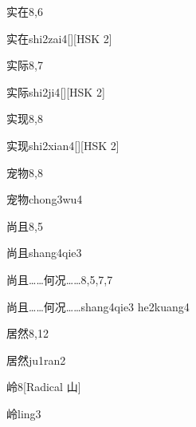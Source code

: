 \begin{entry}{实在}{8,6}
  \begin{phonetics}{实在}{shi2zai4}[][HSK 2]
  \end{phonetics}
\end{entry}

\begin{entry}{实际}{8,7}
  \begin{phonetics}{实际}{shi2ji4}[][HSK 2]
  \end{phonetics}
\end{entry}

\begin{entry}{实现}{8,8}
  \begin{phonetics}{实现}{shi2xian4}[][HSK 2]
  \end{phonetics}
\end{entry}

\begin{entry}{宠物}{8,8}
  \begin{phonetics}{宠物}{chong3wu4}
  \end{phonetics}
\end{entry}

\begin{entry}{尚且}{8,5}
  \begin{phonetics}{尚且}{shang4qie3}
  \end{phonetics}
\end{entry}

\begin{entry}{尚且……何况……}{8,5,7,7}
  \begin{phonetics}{尚且……何况……}{shang4qie3 he2kuang4}
  \end{phonetics}
\end{entry}

\begin{entry}{居然}{8,12}
  \begin{phonetics}{居然}{ju1ran2}
  \end{phonetics}
\end{entry}

\begin{entry}{岭}{8}[Radical 山]
  \begin{phonetics}{岭}{ling3}
  \end{phonetics}
\end{entry}

